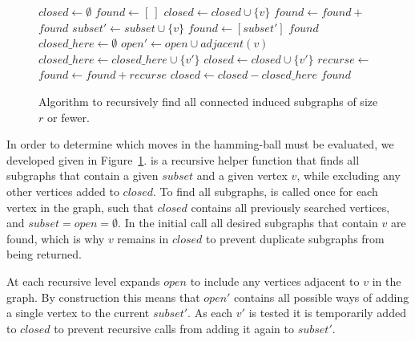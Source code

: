 \begin{figure}
  \begin{algorithmic}[1]
    \State $closed \leftarrow \emptyset$
    \State $found \leftarrow [~]$
      \State $closed \leftarrow closed \cup \{v\}$
      \State $found \leftarrow found + $
    \EndFor
    \State \Return $found$
  \EndProcedure
    \State $subset' \leftarrow subset \cup \{v\}$
    \State $found \leftarrow [subset']$
      \Return $found$
    \EndIf
    \State $closed\_here \leftarrow \emptyset$
    \State $open' \leftarrow open \cup adjacent(v)$
        \State $closed\_here \leftarrow closed\_here \cup \{v'\}$
        \State $closed \leftarrow closed \cup \{v'\}$
        \State $recurse \leftarrow $
        \State $found \leftarrow found + recurse$
    \EndFor
    \State $closed \leftarrow closed - closed\_here$
    \State \Return $found$
  \EndProcedure
\end{algorithmic}
  \caption{Algorithm to recursively find all connected induced subgraphs of size $r$ or fewer.}
  \label{fig-connected-subgraphs}
\end{figure}

In order to determine which moves in the hamming-ball must be evaluated,
we developed  given in Figure~\ref{fig-connected-subgraphs}.
 is a recursive helper function that finds all subgraphs
that contain a given $subset$ and a given vertex $v$, while excluding
any other vertices added to $closed$. To find all subgraphs, 
is called once for each vertex in the graph, such that $closed$ contains
all previously searched vertices, and $subset=open=\emptyset$. In the initial
call all desired subgraphs that contain $v$ are found, which is why $v$ remains
in $closed$ to prevent duplicate subgraphs from being returned.

At each recursive level  expands $open$ to include any vertices
adjacent to $v$ in the graph. By construction this means that $open'$ contains
all possible ways of adding a single vertex to the current $subset'$. As each $v'$
is tested it is temporarily added to $closed$ to prevent recursive calls
from adding it again to $subset'$.

